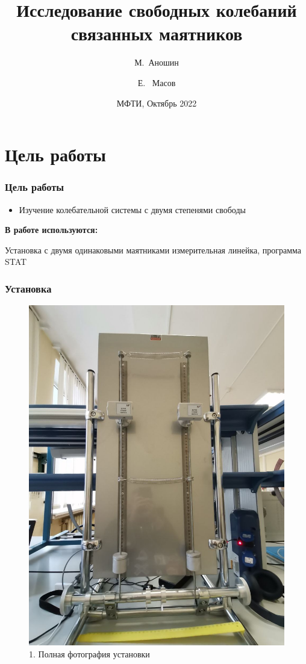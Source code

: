 \documentclass[xcolor=table]{beamer}
\title[Исследование свободных колебаний связанных маятников] %
{Исследование свободных колебаний связанных маятников}
\author[Аношин, Масов] 
{М.~Аношин\inst{1} \and Е. ~Масов\inst{1}}
\date[15.10.2022] 
{МФТИ, Октябрь 2022}
\begin{document}
\frame{\titlepage}

\section{Цель работы}
\begin{frame}\frametitle{Цель работы}
    \begin{itemize}
        \item Изучение колебательной системы с двумя степенями свободы
    \end{itemize}
    \vspace{15}
    \large{\textbf{В работе используются:}}\\
    \begin{itemize}
        \large \normalsize{Установка с двумя одинаковыми маятниками измерительная линейка, программа STAT}
    \end{itemize}
\end{frame}


\begin{frame}\frametitle{Установка}
    \begin{figure}
        \centering
        \includegraphics[scale=0.15]{installation.jpg}
        \caption{1. Полная фотография установки}
        \label{fig:my_label}
    \end{figure}
\end{frame}
\end{document}
